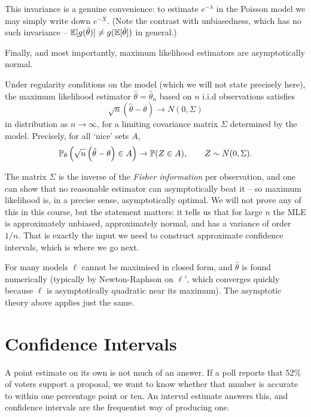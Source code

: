\documentclass[a4paper]{scrartcl}
\begin{document}
This invariance is a genuine convenience: to estimate $e^{-\lambda}$ in the Poisson model we may simply write down $e^{-\overline{X}}$. (Note the contrast with unbiasedness, which has no such invariance -- $\mathbb{E}[g(\hat\theta)] \neq g(\mathbb{E}[\hat\theta])$ in general.)

Finally, and most importantly, maximum likelihood estimators are asymptotically normal.

\begin{fact}
  Under regularity conditions on the model (which we will not state precisely here), the maximum likelihood estimator $\hat\theta = \hat\theta_n$ based on $n$ i.i.d observations satisfies
  $$
  \sqrt{n}\left(\hat\theta - \theta\right) \to N(0, \Sigma)
  $$
  in distribution as $n \to \infty$, for a limiting covariance matrix $\Sigma$ determined by the model. Precisely, for all `nice' sets $A$,
  $$
  \mathbb{P}_\theta\left(\sqrt{n}\left(\hat\theta - \theta\right) \in A\right) \to \mathbb{P}(Z \in A), \qquad Z \sim N(0,\Sigma).
  $$
\end{fact}

The matrix $\Sigma$ is the inverse of the \emph{Fisher information} per observation, and one can show that no reasonable estimator can asymptotically beat it -- so maximum likelihood is, in a precise sense, asymptotically optimal. We will not prove any of this in this course, but the statement matters: it tells us that for large $n$ the MLE is approximately unbiased, approximately normal, and has a variance of order $1/n$. That is exactly the input we need to construct approximate confidence intervals, which is where we go next.

\begin{remark}
  For many models $\ell$ cannot be maximised in closed form, and $\hat\theta$ is found numerically (typically by Newton-Raphson on $\ell'$, which converges quickly because $\ell$ is asymptotically quadratic near its maximum). The asymptotic theory above applies just the same.
\end{remark}


\section{Confidence Intervals}

A point estimate on its own is not much of an answer. If a poll reports that $52\%$ of voters support a proposal, we want to know whether that number is accurate to within one percentage point or ten. An interval estimate answers this, and confidence intervals are the frequentist way of producing one.
\end{document}
